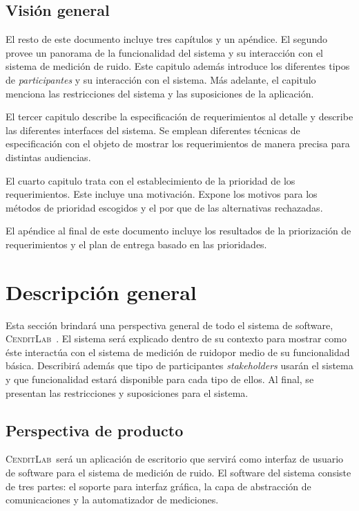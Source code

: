 \documentclass[paper=a4,oneside,fontsize=12pt]{article}
\newcommand{\AppName}{\textsc{CenditLab}\ }
\newcommand{\smr}{sistema de medición de ruido}
\begin{document}
	
	\subsection{Visión general}
	
	El resto de este documento incluye tres capítulos y un apéndice. El segundo provee un panorama de la funcionalidad del sistema y su interacción con el \smr. Este capitulo además introduce los diferentes tipos de \emph{participantes} y su interacción con el sistema. Más adelante, el capitulo menciona las restricciones del sistema y las suposiciones de la aplicación.
	
	El tercer capitulo describe la especificación de requerimientos al detalle y describe las diferentes interfaces del sistema. Se emplean diferentes técnicas de especificación con el objeto de mostrar los requerimientos de manera precisa para distintas audiencias.
	
	El cuarto capitulo trata con el establecimiento de la prioridad de los requerimientos. Este incluye una motivación. Expone los motivos para los métodos de prioridad escogidos y el por que de las alternativas rechazadas.  
	
	El apéndice al final de este documento incluye los resultados de la priorización de requerimientos y el plan de entrega basado en las prioridades.
	
	\section{Descripción general}
	
	Esta sección brindará una perspectiva general de todo el sistema de software, \AppName. El sistema será explicado dentro de su contexto para mostrar como éste interactúa con el \smr por medio de su funcionalidad básica. Describirá además que tipo de participantes \textendash \emph{stakeholders} \textendash usarán el sistema y que funcionalidad estará disponible para cada tipo de ellos. Al final, se presentan las restricciones y suposiciones para el sistema.
	
	\subsection{Perspectiva de producto}
	
	\AppName será un aplicación de escritorio que servirá como interfaz de usuario de software para el \smr. El software del sistema consiste de tres partes: el soporte para interfaz gráfica, la capa de abstracción de comunicaciones y la automatizador de mediciones.
	
\end{document}
